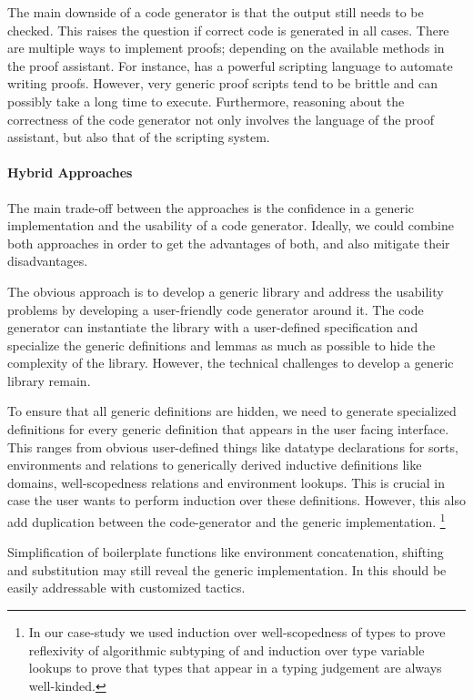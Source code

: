 The main downside of a code generator is that the output still needs to be
checked. This raises the question if correct code is generated in all cases.
There are multiple ways to implement proofs; depending on the available methods
in the proof assistant. For instance, \Coq has a powerful scripting language to
automate writing proofs. However, very generic proof scripts tend to be brittle
and can possibly take a long time to execute. Furthermore, reasoning about the
correctness of the code generator not only involves the language of the proof
assistant, but also that of the scripting system.


\paragraph{Hybrid Approaches}

The main trade-off between the approaches is the confidence in a generic
implementation and the usability of a code generator. Ideally, we could combine
both approaches in order to get the advantages of both, and also mitigate their
disadvantages.

The obvious approach is to develop a generic library and address the usability
problems by developing a user-friendly code generator around it. The code
generator can instantiate the library with a user-defined specification and
specialize the generic definitions and lemmas as much as possible to hide the
complexity of the library. However, the technical challenges to develop a
generic library remain.

To ensure that all generic definitions are hidden, we need to generate
specialized definitions for every generic definition that appears in the user
facing interface. This ranges from obvious user-defined things like datatype
declarations for sorts, environments and relations to generically derived
inductive definitions like domains, well-scopedness relations and environment
lookups. This is crucial in case the user wants to perform induction over these
definitions. However, this also add duplication between the code-generator and
the generic implementation.
\footnote{In our case-study we used induction over well-scopedness of types to
  prove reflexivity of algorithmic subtyping of \fsub\xspace and induction over
  type variable lookups to prove that \fomega\xspace types that appear in a
  typing judgement are always well-kinded.}

Simplification of boilerplate functions like environment concatenation, shifting
and substitution may still reveal the generic implementation. In \Coq this
should be easily addressable with customized tactics.

